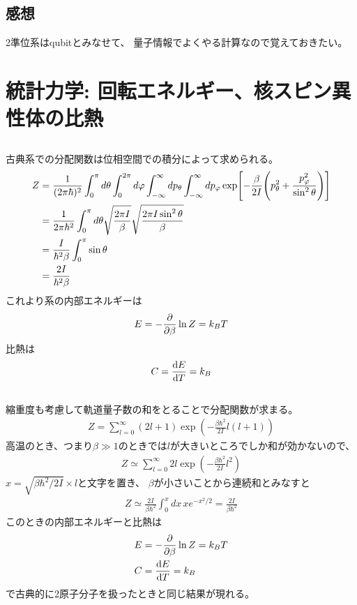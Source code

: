 \documentclass[../../master.tex]{subfiles}
\begin{document}
\subsection*{感想}
2準位系はqubitとみなせて、
量子情報でよくやる計算なので覚えておきたい。

\clearpage
\section{統計力学: 回転エネルギー、核スピン異性体の比熱}
\subsection{}
古典系での分配関数は位相空間での積分によって求められる。
\begin{align}
    Z
    &= \frac{1}{(2\pi\hbar)^2}\int_{0}^{\pi}d\theta \int_{0}^{2\pi}d\varphi
        \int_{-\infty}^{\infty}dp_\theta \int_{-\infty}^{\infty}dp_{\varphi} \exp[
        -\frac{\beta}{2I}\qty(p_\theta^2+\frac{p_\varphi^2}{\sin^2\theta})]\\
    &= \frac{1}{2\pi\hbar^2}\int_{0}^{\pi}d\theta \sqrt{\frac{2\pi I}{\beta}} \sqrt{\frac{2\pi I \sin^2\theta}{\beta}}\\
    &= \frac{I}{\hbar^2\beta}\int_{0}^{\pi}\sin\theta\\
    &=\frac{2 I}{\hbar^2 \beta}
\end{align}
これより系の内部エネルギーは
\begin{align}
    E = -\pdv{\beta}\ln Z = k_BT
\end{align}
比熱は
\begin{align}
    C = \dv{E}{T} = k_B
\end{align}
\subsection{}
縮重度も考慮して軌道量子数の和をとることで分配関数が求まる。
\begin{align}
    Z = \sum_{l=0}^{\infty}(2l+1)\exp(-\frac{\beta\hbar^2}{2I}l(l+1))
\end{align}
高温のとき、つまり\(\beta\gg 1\)のときでは\(l\)が大きいところでしか和が効かないので、
\begin{align}
    Z \simeq \sum_{l=0}^{\infty} 2l\exp(-\frac{\beta\hbar^2}{2I}l^2)
\end{align}
\(x=\sqrt{\beta\hbar^2/2I}\times l\)と文字を置き、
\(\beta\)が小さいことから連続和とみなすと
\begin{align}
    Z \simeq \frac{2I}{\beta\hbar^2}\int_{0}^{x} dx\, xe^{-x^2/2} = \frac{2I}{\beta\hbar^2}
\end{align}
このときの内部エネルギーと比熱は
\begin{align}
    E &= -\pdv{\beta}\ln Z = k_B T\\
    C &= \dv{E}{T} = k_B
\end{align}
で古典的に2原子分子を扱ったときと同じ結果が現れる。
\end{document}
